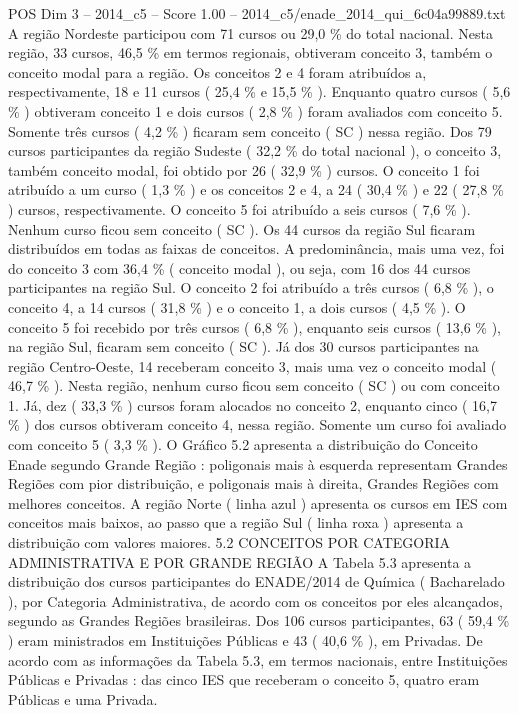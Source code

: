 \begin{textsample}{POS Dim 3 – 2014\_c5 – Score 1.00 – 2014\_c5/enade\_2014\_qui\_6c04a99889.txt}
A região Nordeste participou com 71 cursos ou 29,0 \% do total nacional.
Nesta região, 33 cursos, 46,5 \% em termos regionais, obtiveram conceito 3, também o conceito modal para a região.
Os conceitos 2 e 4 foram atribuídos a, respectivamente, 18 e 11 cursos ( 25,4 \% e 15,5 \% ).
Enquanto quatro cursos ( 5,6 \% ) obtiveram conceito 1 e dois cursos ( 2,8 \% ) foram avaliados com conceito 5.
Somente três cursos ( 4,2 \% ) ficaram sem conceito ( SC ) nessa região.
Dos 79 cursos participantes da região Sudeste ( 32,2 \% do total nacional ), o conceito 3, também conceito modal, foi obtido por 26 ( 32,9 \% ) cursos.
O conceito 1 foi atribuído a um curso ( 1,3 \% ) e os conceitos 2 e 4, a 24 ( 30,4 \% ) e 22 ( 27,8 \% ) cursos, respectivamente.
O conceito 5 foi atribuído a seis cursos ( 7,6 \% ).
Nenhum curso ficou sem conceito ( SC ).
Os 44 cursos da região Sul ficaram distribuídos em todas as faixas de conceitos.
A predominância, mais uma vez, foi do conceito 3 com 36,4 \% ( conceito modal ), ou seja, com 16 dos 44 cursos participantes na região Sul.
O conceito 2 foi atribuído a três cursos ( 6,8 \% ), o conceito 4, a 14 cursos ( 31,8 \% ) e o conceito 1, a dois cursos ( 4,5 \% ).
O conceito 5 foi recebido por três cursos ( 6,8 \% ), enquanto seis cursos ( 13,6 \% ), na região Sul, ficaram sem conceito ( SC ).
Já dos 30 cursos participantes na região Centro-Oeste, 14 receberam conceito 3, mais uma vez o conceito modal ( 46,7 \% ).
Nesta região, nenhum curso ficou sem conceito ( SC ) ou com conceito 1.
Já, dez ( 33,3 \% ) cursos foram alocados no conceito 2, enquanto cinco ( 16,7 \% ) dos cursos obtiveram conceito 4, nessa região.
Somente um curso foi avaliado com conceito 5 ( 3,3 \% ).
O Gráfico 5.2 apresenta a distribuição do Conceito Enade segundo Grande Região : poligonais mais à esquerda representam Grandes Regiões com pior distribuição, e poligonais mais à direita, Grandes Regiões com melhores conceitos.
A região Norte ( linha azul ) apresenta os cursos em IES com conceitos mais baixos, ao passo que a região Sul ( linha roxa ) apresenta a distribuição com valores maiores. 5.2 CONCEITOS POR CATEGORIA ADMINISTRATIVA E POR GRANDE REGIÃO A Tabela 5.3 apresenta a distribuição dos cursos participantes do ENADE/2014 de Química ( Bacharelado ), por Categoria Administrativa, de acordo com os conceitos por eles alcançados, segundo as Grandes Regiões brasileiras.
Dos 106 cursos participantes, 63 ( 59,4 \% ) eram ministrados em Instituições Públicas e 43 ( 40,6 \% ), em Privadas.
De acordo com as informações da Tabela 5.3, em termos nacionais, entre Instituições Públicas e Privadas : das cinco IES que receberam o conceito 5, quatro eram Públicas e uma Privada.

\end{textsample}
